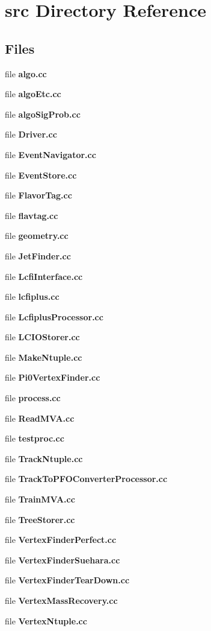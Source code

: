 \section{src Directory Reference}
\label{dir_68267d1309a1af8e8297ef4c3efbcdba}
\subsection*{Files}
\begin{DoxyCompactItemize}
\item 
file {\bf algo.\-cc}
\item 
file {\bf algo\-Etc.\-cc}
\item 
file {\bf algo\-Sig\-Prob.\-cc}
\item 
file {\bf Driver.\-cc}
\item 
file {\bf Event\-Navigator.\-cc}
\item 
file {\bf Event\-Store.\-cc}
\item 
file {\bf Flavor\-Tag.\-cc}
\item 
file {\bf flavtag.\-cc}
\item 
file {\bf geometry.\-cc}
\item 
file {\bf Jet\-Finder.\-cc}
\item 
file {\bf Lcfi\-Interface.\-cc}
\item 
file {\bf lcfiplus.\-cc}
\item 
file {\bf Lcfiplus\-Processor.\-cc}
\item 
file {\bf L\-C\-I\-O\-Storer.\-cc}
\item 
file {\bf Make\-Ntuple.\-cc}
\item 
file {\bf Pi0\-Vertex\-Finder.\-cc}
\item 
file {\bf process.\-cc}
\item 
file {\bf Read\-M\-V\-A.\-cc}
\item 
file {\bf testproc.\-cc}
\item 
file {\bf Track\-Ntuple.\-cc}
\item 
file {\bf Track\-To\-P\-F\-O\-Converter\-Processor.\-cc}
\item 
file {\bf Train\-M\-V\-A.\-cc}
\item 
file {\bf Tree\-Storer.\-cc}
\item 
file {\bf Vertex\-Finder\-Perfect.\-cc}
\item 
file {\bf Vertex\-Finder\-Suehara.\-cc}
\item 
file {\bf Vertex\-Finder\-Tear\-Down.\-cc}
\item 
file {\bf Vertex\-Mass\-Recovery.\-cc}
\item 
file {\bf Vertex\-Ntuple.\-cc}
\end{DoxyCompactItemize}

